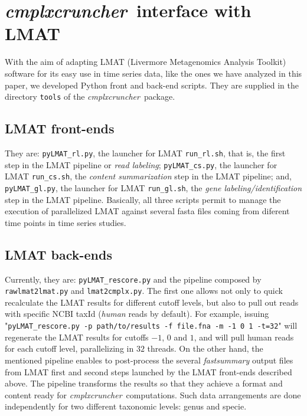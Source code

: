 \documentclass[12pt,oneside,letterpaper]{article}
\newcommand{\CC}[0]{\emph{cmplxcruncher}}
\begin{document}
\section{\CC\ interface with LMAT} \label{sec:lmat}
With the aim of adapting LMAT (Livermore Metagenomics Analysis Toolkit) software\cite{LMAT} for its easy use in time series data, like the ones we have analyzed in this paper\cite{kwashiorkor}, we developed Python front and back-end scripts. They are supplied in the directory \texttt{tools} of the \CC\ package.

\subsection{LMAT front-ends} They are: \texttt{pyLMAT\_rl.py}, the launcher for LMAT \texttt{run\_rl.sh}, that is, the first step in the LMAT pipeline or \emph{read labeling}; \texttt{pyLMAT\_cs.py}, the launcher for LMAT \texttt{run\_cs.sh}, the \emph{content summarization} step in the LMAT pipeline; and, \texttt{pyLMAT\_gl.py}, the launcher for LMAT \texttt{run\_gl.sh}, the \emph{gene labeling/identification} step in the LMAT pipeline. Basically, all three scripts permit to manage the execution of parallelized LMAT against several fasta files coming from diferent time points in time series studies.

\subsection{LMAT back-ends} Currently, they are: \texttt{pyLMAT\_rescore.py} and the pipeline composed by \texttt{rawlmat2lmat.py} and \texttt{lmat2cmplx.py}. The first one allows not only to quick recalculate the LMAT results for different cutoff levels, but also to pull out reads with specific NCBI taxId (\emph{human} reads by default). For example, issuing "\texttt{pyLMAT\_rescore.py -p path/to/results -f file.fna -m -1 0 1 -t=32}" will regenerate the LMAT results for cutoffs $-1$, $0$ and $1$, and will pull human reads for each cutoff level, parallelizing in $32$ threads. On the other hand, the mentioned pipeline enables to post-process the several \emph{fastsummary} output files from LMAT first and second steps launched by the LMAT front-ends described above. The pipeline transforms the results so that they achieve a format and content ready for \CC\ computations. Such data arrangements are done independently for two different taxonomic levels: genus and specie.
\end{document}
